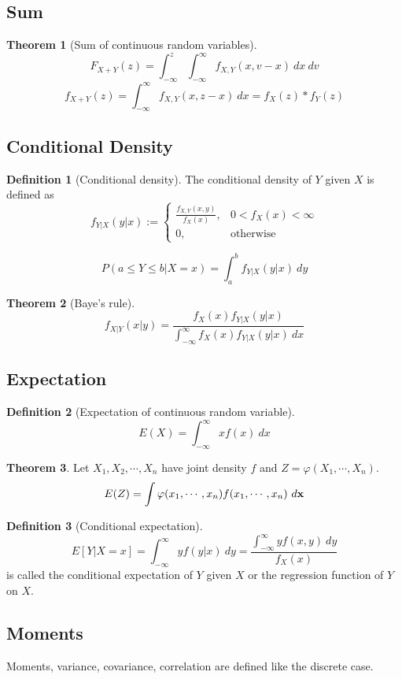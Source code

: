 \documentclass[10pt, a4paper]{extarticle}
\theoremstyle{definition}
\newtheorem{thm}{Theorem}
\newtheorem{defn}{Definition}
\begin{document}
\subsection{Sum}
\begin{thm}[Sum of continuous random variables]
	\[F_{X+Y}(z)=\int_{-\infty}^z\int_{-\infty}^\infty f_{X,Y}(x,v-x)\ dx\ dv\]
	\[f_{X+Y}(z)=\int_{-\infty}^\infty f_{X,Y}(x,z-x)\ dx=f_X(z)*f_Y(z)\]
\end{thm}

\subsection{Conditional Density}
\begin{defn}[Conditional density]
	The conditional density of $Y$ given $X$ is defined as
	\[f_{Y|X}(y|x):=
		\begin{cases}
			\frac{f_{X,Y}(x,y)}{f_X(x)}, & 0<f_X(x)<\infty  \\
			0,                           & \text{otherwise}
		\end{cases}
	\]

	\[P(a\leq Y\leq b|X=x)=\int_a^b f_{Y|X}(y|x)\ dy\]

\end{defn}
\begin{thm}[Baye's rule]
	\[f_{X|Y}(x|y)=\frac{f_X(x)f_{Y|X}(y|x)}{\int_{-\infty}^{\infty}f_X(x)f_{Y|X}(y|x)\ dx}\]
\end{thm}

\subsection{Expectation}
\begin{defn}[Expectation of continuous random variable]
	\[E(X)=\int_{-\infty}^\infty xf(x)\ dx\]
\end{defn}
\begin{thm}
	Let $X_1,X_2,\cdots,X_n$ have joint density $f$ and $Z=\varphi(X_1,\cdots,X_n)$.
	\[E(Z)=\int \varphi(x_1,\cdots,x_n)f(x_1,\cdots,x_n)\ d\vb{x}\]
\end{thm}
\begin{defn}[Conditional expectation]
	\[E[Y|X=x]=\int_{-\infty}^\infty yf(y|x)\ dy=\frac{\int_{-\infty}^\infty yf(x,y)\ dy}{f_X(x)}\]
	is called the conditional expectation of $Y$ given $X$ or the regression function of $Y$ on $X$.
\end{defn}

\subsection{Moments}
Moments, variance, covariance, correlation are defined like the discrete case.
\end{document}
